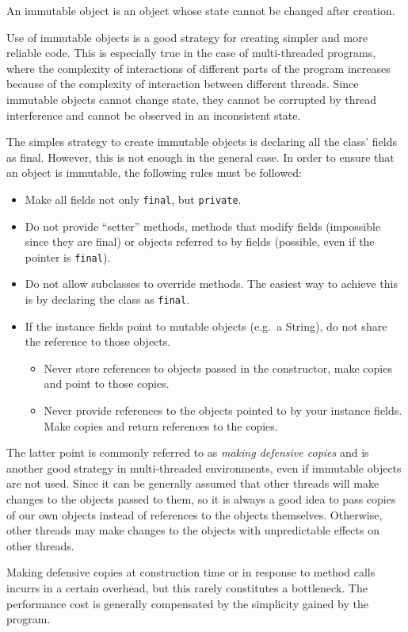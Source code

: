 An immutable object is an object whose state cannot be changed after
creation. 

Use of immutable objects is a good strategy for creating simpler and
more reliable code. This is especially true in the case of
multi-threaded programs, where the complexity of interactions of
different parts of the program increases because of the complexity of
interaction between different threads. Since immutable objects cannot
change state, they cannot be corrupted by thread interference and
cannot be observed in an inconsistent state.

The simples strategy to create immutable objects is declaring all the
class' fields as final. However, this is not enough in the general
case. In order to ensure that an object is immutable, the following
rules must be followed: 

\begin{itemize}
\item Make all fields not only \verb+final+, but \verb+private+.
\item Do not provide ``setter'' methods, methods that modify fields
  (impossible since they are final) or objects referred to by fields
  (possible, even if the pointer is \verb+final+).
\item Do not allow subclasses to override methods. The easiest way to
  achieve this is by declaring the class as \verb+final+.
\item If the instance fields point to mutable objects (e.g.~a String),
  do not share the reference to those objects. 
  \begin{itemize}
  \item Never store references to objects passed in the constructor,
    make copies and point to those copies.
  \item Never provide references to the objects pointed to by your
    instance fields. Make copies and return references to the copies. 
  \end{itemize}
\end{itemize}

The latter point is commonly referred to as \emph{making defensive
  copies} and is another good strategy in multi-threaded environments,
even if immutable objects are not used. 
%
Since it can be generally assumed that other threads will make
changes to the objects passed to them, so it is always a good idea to
pass copies of our own objects instead of references to the objects
themselves. Otherwise, other threads may make changes to the objects
with unpredictable effects on other threads. 

Making defensive copies at construction time or in response to method
calls incurrs in a certain overhead, but this rarely constitutes a
bottleneck. The performance cost is generally compensated by the
simplicity gained by the program. 

